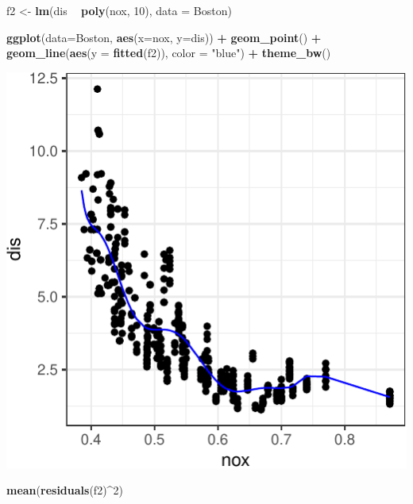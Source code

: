 \documentclass[]{article}
\newenvironment{Shaded}{\begin{snugshade}}{\end{snugshade}}
\newcommand{\DataTypeTok}[1]{\textcolor[rgb]{0.13,0.29,0.53}{#1}}
\newcommand{\DecValTok}[1]{\textcolor[rgb]{0.00,0.00,0.81}{#1}}
\newcommand{\KeywordTok}[1]{\textcolor[rgb]{0.13,0.29,0.53}{\textbf{#1}}}
\newcommand{\NormalTok}[1]{#1}
\newcommand{\OperatorTok}[1]{\textcolor[rgb]{0.81,0.36,0.00}{\textbf{#1}}}
\newcommand{\StringTok}[1]{\textcolor[rgb]{0.31,0.60,0.02}{#1}}
\begin{document}
\begin{Shaded}
\begin{Highlighting}[]
\NormalTok{f2 <-}\StringTok{ }\KeywordTok{lm}\NormalTok{(dis }\OperatorTok{~}\StringTok{ }\KeywordTok{poly}\NormalTok{(nox, }\DecValTok{10}\NormalTok{), }\DataTypeTok{data =}\NormalTok{ Boston)}

\KeywordTok{ggplot}\NormalTok{(}\DataTypeTok{data=}\NormalTok{Boston, }\KeywordTok{aes}\NormalTok{(}\DataTypeTok{x=}\NormalTok{nox, }\DataTypeTok{y=}\NormalTok{dis)) }\OperatorTok{+}\StringTok{ }
\StringTok{  }\KeywordTok{geom_point}\NormalTok{() }\OperatorTok{+}\StringTok{ }
\StringTok{  }\KeywordTok{geom_line}\NormalTok{(}\KeywordTok{aes}\NormalTok{(}\DataTypeTok{y =} \KeywordTok{fitted}\NormalTok{(f2)), }\DataTypeTok{color =} \StringTok{"blue"}\NormalTok{) }\OperatorTok{+}
\StringTok{  }\KeywordTok{theme_bw}\NormalTok{()}
\end{Highlighting}
\end{Shaded}

\begin{center}\includegraphics{sol_A4_files/figure-latex/unnamed-chunk-2-1} \end{center}

\begin{Shaded}
\begin{Highlighting}[]
\KeywordTok{mean}\NormalTok{(}\KeywordTok{residuals}\NormalTok{(f2)}\OperatorTok{^}\DecValTok{2}\NormalTok{)}
\end{Highlighting}
\end{Shaded}
\end{document}
